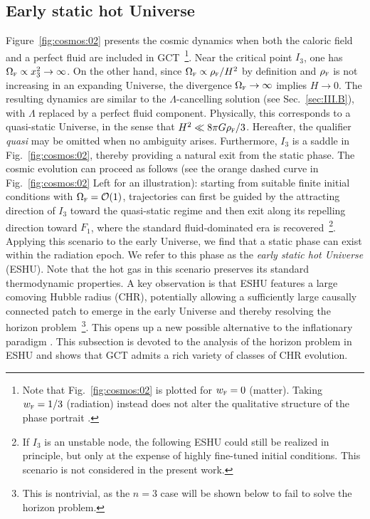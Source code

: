 \documentclass[aps,prd,twocolumn]{revtex4-2}
\newcommand\subF{\textsc{f}}
\begin{document}
\subsection{Early static hot Universe}\label{sec:III.C}
Figure~\ref{fig:cosmos:02} presents the cosmic dynamics when both the caloric field and a perfect fluid are included in GCT~\footnote{Note that Fig.~\ref{fig:cosmos:02} is plotted for $w_\subF=0$ (matter). Taking $w_\subF=1/3$ (radiation) instead does not alter the qualitative structure of the phase portrait \cite{NotShown}.}. Near the critical point $I_3$, one has $\Omega_\subF\propto x_3^2\rightarrow\infty$. On the other hand, since $\Omega_\subF\propto\rho_\subF/H^2$ by definition and $\rho_\subF$ is not increasing in an expanding Universe, the divergence $\Omega_\subF\rightarrow\infty$ implies $H\rightarrow0$. The resulting dynamics are similar to the $\Lambda$-cancelling solution (see Sec.~\ref{sec:III.B}), with $\Lambda$ replaced by a perfect fluid component. Physically, this corresponds to a quasi-static Universe, in the sense that $H^2\ll8\pi G\rho_\subF/3$. Hereafter, the qualifier \textit{quasi} may be omitted when no ambiguity arises. Furthermore, $I_3$ is a saddle in Fig.~\ref{fig:cosmos:02}, thereby providing a natural exit from the static phase. The cosmic evolution can proceed as follows (see the orange dashed curve in Fig.~\ref{fig:cosmos:02} Left for an illustration): starting from suitable finite initial conditions with $\Omega_\subF=\mathcal{O}(1)$, trajectories can first be guided by the attracting direction of $I_3$ toward the quasi-static regime and then exit along its repelling direction toward $F_1$, where the standard fluid-dominated era is recovered~\footnote{If $I_3$ is an unstable node, the following ESHU could still be realized in principle, but only at the expense of highly fine-tuned initial conditions. This scenario is not considered in the present work.}. Applying this scenario to the early Universe, we find that a static phase can exist within the radiation epoch. We refer to this phase as the \textit{early static hot Universe} (ESHU). Note that the hot gas in this scenario preserves its standard thermodynamic properties. A key observation is that ESHU features a large comoving Hubble radius (CHR), potentially allowing a sufficiently large causally connected patch to emerge in the early Universe and thereby resolving the horizon problem~\footnote{This is nontrivial, as the $n=3$ case will be shown below to fail to solve the horizon problem.}. This opens up a new possible alternative to the inflationary paradigm \cite{Guth1981.PRD.23.347,Linde1982.PLB.108.389,Albrecht1982.PRL.48.1220}. This subsection is devoted to the analysis of the horizon problem in ESHU and shows that GCT admits a rich variety of classes of CHR evolution.
\end{document}

